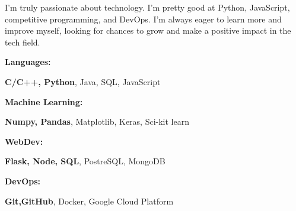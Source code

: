 \documentclass[9pt]{developercv}
\begin{document}
I'm truly passionate about technology. I'm pretty good at Python, JavaScript, competitive programming, and DevOps. I'm always eager to learn more and improve myself, looking for chances to grow and make a positive impact in the tech field.


\vspace{-6pt}

\begin{minipage}[t]{0.2\textwidth}
    \textbf{Languages:}
\end{minipage}
\hfill
\begin{minipage}[t]{0.73\textwidth}
  \textbf{C/C++, Python}, Java, SQL, JavaScript  
\end{minipage}
\vspace{4mm}

\begin{minipage}[t]{0.2\textwidth}
    \textbf{Machine Learning:}
\end{minipage}
\hfill
\begin{minipage}[t]{0.73\textwidth}
  \textbf{Numpy, Pandas}, Matplotlib, Keras, Sci-kit learn  
\end{minipage}
\vspace{4mm}

\begin{minipage}[t]{0.2\textwidth}
    \textbf{WebDev:}
\end{minipage}
\hfill
\begin{minipage}[t]{0.73\textwidth}
  \textbf{Flask, Node, SQL}, PostreSQL, MongoDB
\end{minipage}
\vspace{4mm}

\begin{minipage}[t]{0.2\textwidth}
    \textbf{DevOps:}
\end{minipage}
\hfill
\begin{minipage}[t]{0.73\textwidth}
  \textbf{Git,GitHub}, Docker, Google Cloud Platform
\end{minipage}
\end{document}
